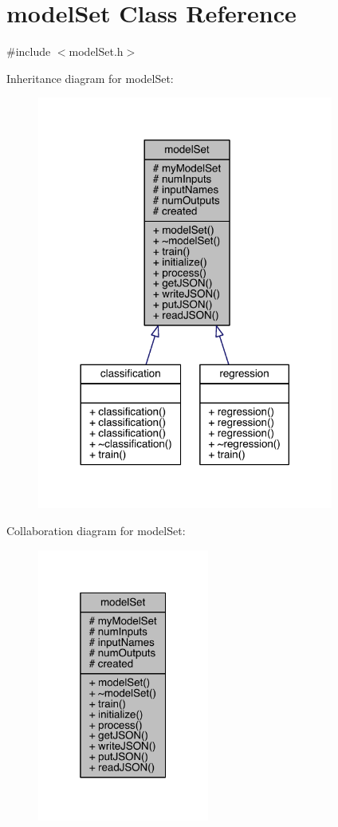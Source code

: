 \hypertarget{classmodel_set}{}\section{model\+Set Class Reference}
\label{classmodel_set}


{\ttfamily \#include $<$model\+Set.\+h$>$}



Inheritance diagram for model\+Set\+:
\nopagebreak
\begin{figure}[H]
\begin{center}
\leavevmode
\includegraphics[width=276pt]{classmodel_set__inherit__graph}
\end{center}
\end{figure}


Collaboration diagram for model\+Set\+:\nopagebreak
\begin{figure}[H]
\begin{center}
\leavevmode
\includegraphics[width=160pt]{classmodel_set__coll__graph}
\end{center}
\end{figure}
